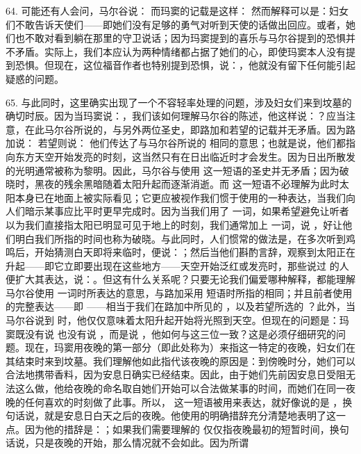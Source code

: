 64. 可能还有人会问，马尔谷说： 而玛窦的记载是这样： 然而解释可以是：妇女们不敢告诉天使们——即她们没有足够的勇气对听到天使的话做出回应。或者，她们也不敢对看到躺在那里的守卫说话；因为玛窦提到的喜乐与马尔谷提到的恐惧并不矛盾。实际上，我们本应认为两种情绪都占据了她们的心，即使玛窦本人没有提到恐惧。但现在，这位福音作者也特别提到恐惧，说：，他就没有留下任何能引起疑惑的问题。\par

65. 与此同时，这里确实出现了一个不容轻率处理的问题，涉及妇女们来到坟墓的确切时辰。因为当玛窦说：，我们该如何理解马尔谷的陈述，他这样说：？应当注意，在此马尔谷所说的，与另外两位圣史，即路加和若望的记载并无矛盾。因为路加说： 若望则说： 他们传达了与马尔谷所说的  相同的意思；也就是说，他们都指向东方天空开始发亮的时刻，这当然只有在日出临近时才会发生。因为日出所散发的光明通常被称为黎明。因此，马尔谷与使用  这一短语的圣史并无矛盾；因为破晓时，黑夜的残余黑暗随着太阳升起而逐渐消逝。而  这一短语不必理解为此时太阳本身已在地面上被实际看见；它更应被视作我们惯于使用的一种表达，当我们向人们暗示某事应比平时更早完成时。因为当我们用了  一词，如果希望避免让听者以为我们直接指太阳已明显可见于地上的时刻，我们通常加上  一词，说 ，好让他们明白我们所指的时间也称为破晓。与此同时，人们惯常的做法是，在多次听到鸡鸣后，开始猜测白天即将来临时，便说：；然后当他们斟酌言辞，观察到太阳正在升起——即它立即要出现在这些地方——天空开始泛红或发亮时，那些说过  的人便扩大其表达，说：。但这有什么关系呢？只要无论我们偏爱哪种解释，都能理解马尔谷使用  一词时所表达的意思，与路加采用  短语时所指的相同；并且前者使用的完整表达——即 ——相当于我们在路加中所见的 ，以及若望所选的 ？此外，当马尔谷说到  时，他仅仅意味着太阳升起开始将光照到天空。但现在的问题是：玛窦既没有说  也没有说 ，而是说 ，他如何与这三位一致？这是必须仔细研究的问题。现在，玛窦用夜晚的第一部分（即此处称为）来指这一特定的夜晚，妇女们在其结束时来到坟墓。我们理解他如此指代该夜晚的原因是：到傍晚时分，她们可以合法地携带香料，因为安息日确实已经结束。因此，由于她们先前因安息日受阻无法这么做，他给夜晚的命名取自她们开始可以合法做某事的时间，而她们在同一夜晚的任何喜欢的时刻做了此事。所以， 这一短语被用来表达，就好像说的是 ，换句话说，就是安息日白天之后的夜晚。他使用的明确措辞充分清楚地表明了这一点。因为他的措辞是：；如果我们需要理解的  仅仅指夜晚最初的短暂时间，换句话说，只是夜晚的开始，那么情况就不会如此。因为所谓  